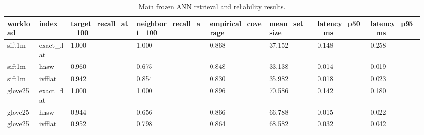 \begin{table}[t]
\centering
\caption{Main frozen ANN retrieval and reliability results.}
\label{tab:main}
\begin{tabular}{llllllll}
\hline
workload & index & target_recall_at_100 & neighbor_recall_at_100 & empirical_coverage & mean_set_size & latency_p50_ms & latency_p95_ms \\
\hline
sift1m & exact\_flat & 1.000 & 1.000 & 0.868 & 37.152 & 0.148 & 0.258 \\
sift1m & hnsw & 0.960 & 0.675 & 0.848 & 33.138 & 0.014 & 0.019 \\
sift1m & ivfflat & 0.942 & 0.854 & 0.830 & 35.982 & 0.018 & 0.023 \\
glove25 & exact\_flat & 1.000 & 1.000 & 0.896 & 70.586 & 0.142 & 0.180 \\
glove25 & hnsw & 0.944 & 0.656 & 0.866 & 66.788 & 0.015 & 0.022 \\
glove25 & ivfflat & 0.952 & 0.798 & 0.864 & 68.582 & 0.032 & 0.042 \\
\hline
\end{tabular}
\end{table}
